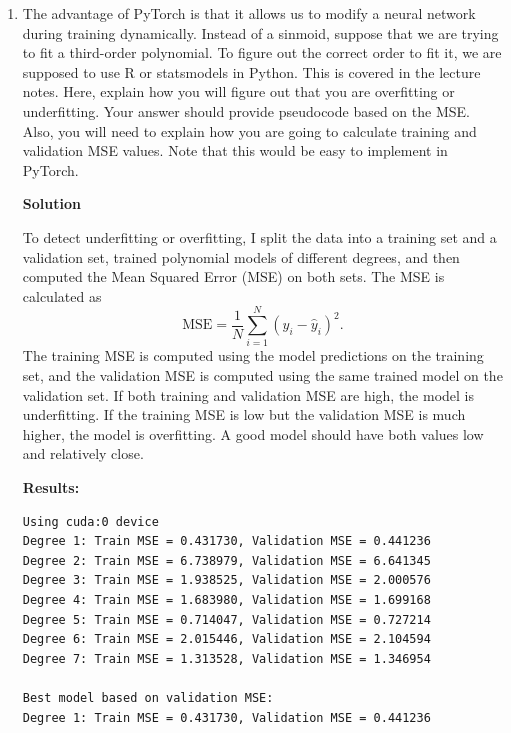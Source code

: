 \documentclass[10pt]{article}
\begin{document}
\begin{enumerate}[label=\textbf{1(\alph*)}]
Using the neural network module with a small learning rate produced stable training and finite coefficients for the 7th-degree polynomial. Unlike larger learning rates that caused divergence, this setup successfully reduced the loss and learned a reasonable approximation. The \texttt{nn} implementation also simplifies the process by automatically handling gradients and parameter updates.

    \item The advantage of PyTorch is that it allows us to modify a neural network during training dynamically. Instead of a sinmoid, suppose that we are trying to fit a third-order polynomial. To figure out the correct order to fit it, we are supposed to use R or statsmodels in Python. This is covered in the lecture notes. Here, explain how you will figure out that you are overfitting or underfitting. Your answer should provide pseudocode based on the MSE. Also, you will need to explain how you are going to calculate training and validation MSE values. Note that this would be easy to implement in PyTorch.

\textbf{Solution}

To detect underfitting or overfitting, I split the data into a training set and a validation set, trained polynomial models of different degrees, and then computed the Mean Squared Error (MSE) on both sets. The MSE is calculated as
\[
\text{MSE} = \frac{1}{N}\sum_{i=1}^{N}(y_i-\hat{y}_i)^2.
\]
The training MSE is computed using the model predictions on the training set, and the validation MSE is computed using the same trained model on the validation set. If both training and validation MSE are high, the model is underfitting. If the training MSE is low but the validation MSE is much higher, the model is overfitting. A good model should have both values low and relatively close.

\textbf{Results:}
\begin{lstlisting}
Using cuda:0 device
Degree 1: Train MSE = 0.431730, Validation MSE = 0.441236
Degree 2: Train MSE = 6.738979, Validation MSE = 6.641345
Degree 3: Train MSE = 1.938525, Validation MSE = 2.000576
Degree 4: Train MSE = 1.683980, Validation MSE = 1.699168
Degree 5: Train MSE = 0.714047, Validation MSE = 0.727214
Degree 6: Train MSE = 2.015446, Validation MSE = 2.104594
Degree 7: Train MSE = 1.313528, Validation MSE = 1.346954

Best model based on validation MSE:
Degree 1: Train MSE = 0.431730, Validation MSE = 0.441236
\end{lstlisting}


\end{enumerate}
\end{document}
